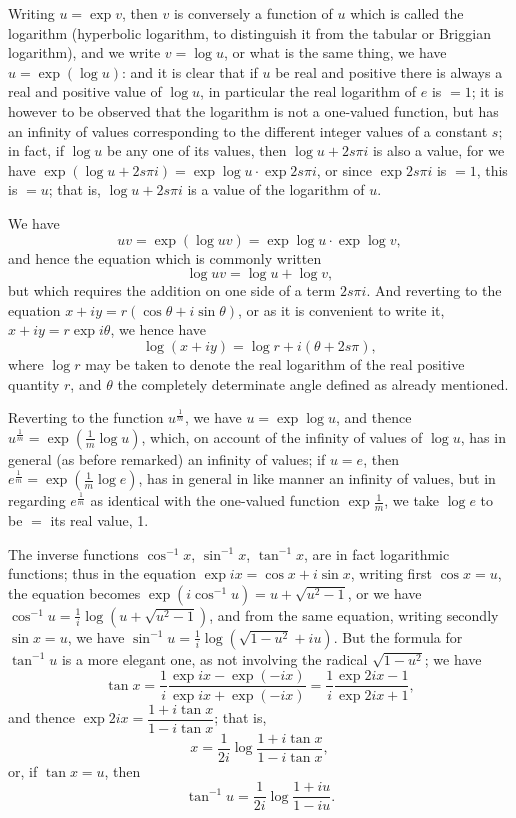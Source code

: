 \documentclass[11pt,a4paper]{article}
\begin{document}
Writing $u = \exp v$, then $v$ is conversely a function of $u$ which is called the logarithm (hyperbolic logarithm, to distinguish it from the tabular or Briggian logarithm), and we write $v = \log u$, or what is the same thing, we have $u = \exp(\log u)$: and it is clear that if $u$ be real and positive there is always a real and positive value of $\log u$, in particular the real logarithm of $e$ is $= 1$; it is however to be observed that the logarithm is not a one-valued function, but has an infinity of values corresponding to the different integer values of a constant $s$; in fact, if $\log u$ be any one of its values, then $\log u + 2s\pi i$ is also a value, for we have $\exp(\log u + 2s\pi i) = \exp\log u \cdot \exp 2s\pi i$, or since $\exp 2s\pi i$ is $= 1$, this is $= u$; that is, $\log u + 2s\pi i$ is a value of the logarithm of $u$.

We have
\[
uv = \exp(\log uv) = \exp\log u \cdot \exp\log v,
\]
and hence the equation which is commonly written
\[
\log uv = \log u + \log v,
\]
but which requires the addition on one side of a term $2s\pi i$. And reverting to the equation $x + iy = r(\cos\theta + i\sin\theta)$, or as it is convenient to write it, $x + iy = r\exp i\theta$, we hence have
\[
\log(x + iy) = \log r + i(\theta + 2s\pi),
\]
where $\log r$ may be taken to denote the real logarithm of the real positive quantity $r$, and $\theta$ the completely determinate angle defined as already mentioned.

Reverting to the function $u^{\frac{1}{m}}$, we have $u = \exp\log u$, and thence $u^{\frac{1}{m}} = \exp(\frac{1}{m}\log u)$, which, on account of the infinity of values of $\log u$, has in general (as before remarked) an infinity of values; if $u = e$, then $e^{\frac{1}{m}} = \exp(\frac{1}{m}\log e)$, has in general in like manner an infinity of values, but in regarding $e^{\frac{1}{m}}$ as identical with the one-valued function $\exp\frac{1}{m}$, we take $\log e$ to be $=$ its real value, 1.

The inverse functions $\cos^{-1}x$, $\sin^{-1}x$, $\tan^{-1}x$, are in fact logarithmic functions; thus in the equation $\exp ix = \cos x + i\sin x$, writing first $\cos x = u$, the equation becomes $\exp(i\cos^{-1}u) = u + \sqrt{u^{2} - 1}$, or we have $\cos^{-1}u = \frac{1}{i}\log(u + \sqrt{u^{2} - 1})$, and from the same equation, writing secondly $\sin x = u$, we have $\sin^{-1}u = \frac{1}{i}\log(\sqrt{1 - u^{2}} + iu)$. But the formula for $\tan^{-1}u$ is a more elegant one, as not involving the radical $\sqrt{1 - u^{2}}$; we have
\[
\tan x = \frac{1}{i}\frac{\exp ix - \exp(-ix)}{\exp ix + \exp(-ix)} = \frac{1}{i}\frac{\exp 2ix - 1}{\exp 2ix + 1},
\]
and thence $\exp 2ix = \dfrac{1 + i\tan x}{1 - i\tan x}$; that is,
\[
x = \frac{1}{2i}\log\frac{1 + i\tan x}{1 - i\tan x},
\]
or, if $\tan x = u$, then
\[
\tan^{-1}u = \frac{1}{2i}\log\frac{1 + iu}{1 - iu}.
\]
\end{document}

